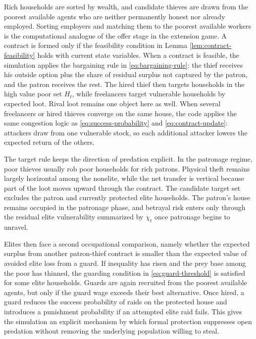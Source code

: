 Rich households are sorted by wealth, and candidate thieves are drawn from the poorest available agents who are neither permanently honest nor already employed. Sorting employers and matching them to the poorest available workers is the computational analogue of the offer stage in the extension game. A contract is formed only if the feasibility condition in Lemma \ref{lem:contract-feasibility} holds with current state variables. When a contract is feasible, the simulation applies the bargaining rule in \eqref{eq:bargaining-rule}: the thief receives his outside option plus the share of residual surplus not captured by the patron, and the patron receives the rest. The hired thief then targets households in the high value poor set $H_t$, while freelancers target vulnerable households by expected loot. Rival loot remains one object here as well. When several freelancers or hired thieves converge on the same house, the code applies the same congestion logic as \eqref{eq:success-probability} and \eqref{eq:contract-update}: attackers draw from one vulnerable stock, so each additional attacker lowers the expected return of the others.

The target rule keeps the direction of predation explicit. In the patronage regime, poor thieves usually rob poor households for rich patrons. Physical theft remains largely horizontal among the nonelite, while the net transfer is vertical because part of the loot moves upward through the contract. The candidate target set excludes the patron and currently protected elite households. The patron's house remains occupied in the patronage phase, and betrayal risk enters only through the residual elite vulnerability summarized by $\chi_t$ once patronage begins to unravel.

Elites then face a second occupational comparison, namely whether the expected surplus from another patron-thief contract is smaller than the expected value of avoided elite loss from a guard. If inequality has risen and the prey base among the poor has thinned, the guarding condition in \eqref{eq:guard-threshold} is satisfied for some elite households. Guards are again recruited from the poorest available agents, but only if the guard wage exceeds their best alternative. Once hired, a guard reduces the success probability of raids on the protected house and introduces a punishment probability if an attempted elite raid fails. This gives the simulation an explicit mechanism by which formal protection suppresses open predation without removing the underlying population willing to steal.

